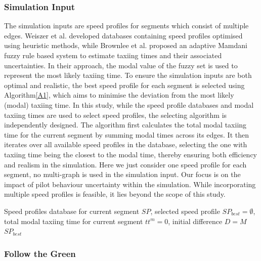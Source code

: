 \documentclass{article}
\begin{document}
\subsubsection{Simulation Input}

The simulation inputs are speed profiles for segments which consist of multiple edges. Weiszer et al. \cite{weiszer2015real} developed databases containing speed profiles optimised using heuristic methods, while Brownlee et al.\cite{brownlee2018fuzzy} proposed an adaptive Mamdani fuzzy rule based system to estimate taxiing times and their associated uncertainties. In their approach, the modal value of the fuzzy set is used to represent the most likely taxiing time. To ensure the simulation inputs are both optimal and realistic, the best speed profile for each segment is selected using Algorithm\ref{A1}, which aims to minimise the deviation from the most likely (modal) taxiing time. In this study, while the speed profile databases \cite{weiszer2015real} and modal taxiing times \cite{brownlee2018fuzzy} are used to select speed profiles, the selecting algorithm is independently designed. The algorithm first calculates the total modal taxiing time for the current segment by summing modal times across its edges. It then iterates over all available speed profiles in the database, selecting the one with taxiing time being the closest to the modal time, thereby ensuring both efficiency and realism in the simulation. Here we just consider one speed profile for each segment, no multi-graph \cite{weiszer2020multi} is used in the simulation input. Our focus is on the impact of pilot behaviour uncertainty within the simulation. While incorporating multiple speed profiles is feasible, it lies beyond the scope of this study.

\begin{algorithm}
    \caption{Select speed profile for each segment.}\label{A1}
    Speed profiles database for current segment $SP$, selected speed profile $SP_{best} = \emptyset$, total modal taxiing time for current segment $tt^m=0$, initial difference $D=M$\;
    \Return $SP_{best}$
\end{algorithm}

\subsubsection{Follow the Green}
\end{document}

